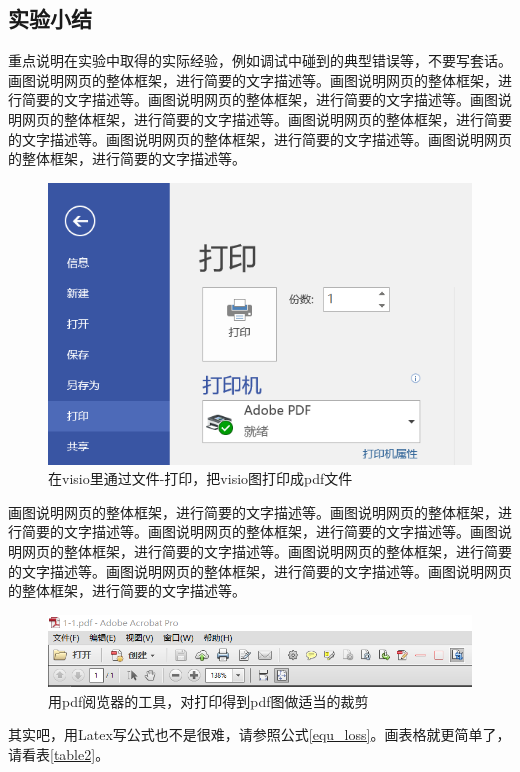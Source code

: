 \documentclass[supercite]{HustGraduPaper}
\theoremstyle{definition}
\begin{document}
    \subsection{实验小结}

    重点说明在实验中取得的实际经验，例如调试中碰到的典型错误等，不要写套话。画图说明网页的整体框架，进行简要的文字描述等。画图说明网页的整体框架，进行简要的文字描述等。画图说明网页的整体框架，进行简要的文字描述等。画图说明网页的整体框架，进行简要的文字描述等。画图说明网页的整体框架，进行简要的文字描述等。画图说明网页的整体框架，进行简要的文字描述等。画图说明网页的整体框架，进行简要的文字描述等。

    \begin{figure}[htb]
        \begin{center}
            \includegraphics[scale=0.60]{images/1-2.png}
            \caption{在visio里通过文件-打印，把visio图打印成pdf文件}
            \label{fig1-2}
        \end{center}
    \end{figure}

    画图说明网页的整体框架，进行简要的文字描述等。画图说明网页的整体框架，进行简要的文字描述等。画图说明网页的整体框架，进行简要的文字描述等。画图说明网页的整体框架，进行简要的文字描述等。画图说明网页的整体框架，进行简要的文字描述等。画图说明网页的整体框架，进行简要的文字描述等。画图说明网页的整体框架，进行简要的文字描述等。

    \begin{figure}[htb]
        \begin{center}
            \includegraphics[scale=0.50]{images/1-3.png}
            \caption{用pdf阅览器的工具，对打印得到pdf图做适当的裁剪}
            \label{fig1-3}
        \end{center}
    \end{figure}
    其实吧，用Latex写公式也不是很难，请参照公式\ref{equ_loss}。画表格就更简单了，请看表\ref{table2}。
\end{document}
